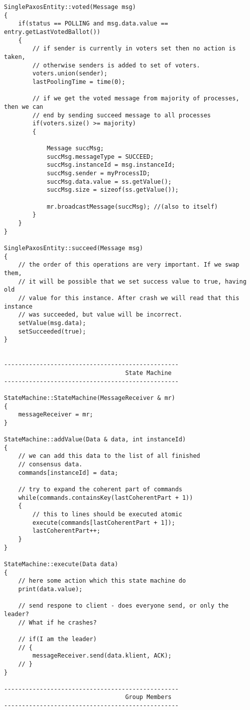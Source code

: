\begin{lstlisting}[frame=lines,caption=Pseudocode of Paxos algorithm]
SinglePaxosEntity::voted(Message msg)
{
	if(status == POLLING and msg.data.value == entry.getLastVotedBallot())
	{
		// if sender is currently in voters set then no action is taken,
		// otherwise senders is added to set of voters.
		voters.union(sender);
		lastPoolingTime = time(0);
		
		// if we get the voted message from majority of processes, then we can
		// end by sending succeed message to all processes
		if(voters.size() >= majority)
		{

			Message succMsg;
			succMsg.messageType = SUCCEED;
			succMsg.instanceId = msg.instanceId;
			succMsg.sender = myProcessID;
			succMsg.data.value = ss.getValue();
			succMsg.size = sizeof(ss.getValue());
			
			mr.broadcastMessage(succMsg); //(also to itself)
		}
	}
}

SinglePaxosEntity::succeed(Message msg)
{
	// the order of this operations are very important. If we swap them,
	// it will be possible that we set success value to true, having old
	// value for this instance. After crash we will read that this instance
	// was succeeded, but value will be incorrect.
	setValue(msg.data);
	setSucceeded(true);
}
			   
			   
-------------------------------------------------
                                  State Machine
-------------------------------------------------			   

StateMachine::StateMachine(MessageReceiver & mr)
{
	messageReceiver = mr;
}
			   
StateMachine::addValue(Data & data, int instanceId)
{
	// we can add this data to the list of all finished 
	// consensus data.
	commands[instanceId] = data;
	
	// try to expand the coherent part of commands
	while(commands.containsKey(lastCoherentPart + 1))
	{
		// this to lines should be executed atomic
		execute(commands[lastCoherentPart + 1]);
		lastCoherentPart++;
	}
}

StateMachine::execute(Data data)
{
	// here some action which this state machine do
	print(data.value);
	
	// send respone to client - does everyone send, or only the leader?
	// What if he crashes?
	
	// if(I am the leader)
	// {
		messageReceiver.send(data.klient, ACK);
	// }
}
			   
-------------------------------------------------
                                  Group Members
-------------------------------------------------


\end{lstlisting}
